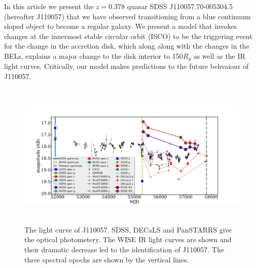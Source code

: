\documentclass{nature}
\begin{document}
In this article we present the $z=0.378$ quasar SDSS
J110057.70-005304.5 (hereafter J110057) that we have observed
transitioning from a blue continuum sloped object to become a regular
galaxy. We present a model that invokes changes at the innermost
stable circular orbit (ISCO) to be the triggering event for the change
in the accretion disk, which along along with the changes in the BELs,
explains a major change to the disk interior to 150$R_{g}$ as well as
the IR light curves. Critically, our model makes predictions to the
future behvaiour of J110057.
 
\begin{figure}
  \centering
  \includegraphics[width=16.00cm, height=7.00cm, trim=0.0cm 0.0cm 0.0cm 0.0cm, clip]
  {../plots/lc/J110057_lc_20171016v2.pdf}
  \caption[]{The light curve of J110057. SDSS, DECaLS and PanSTARRS
    give the optical photometery. The WISE IR light curves are shown and
    their dramatic decrease led to the identification of J110057. The
    three spectral epochs are shown by the vertical lines.}
  \label{fig:J110057_LC_CRTS}
\end{figure}
\end{document}
